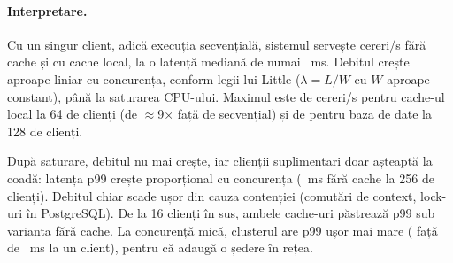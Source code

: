\paragraph{Interpretare.} Cu un singur client, adică execuția secvențială, sistemul servește
 cereri/s fără cache și  cu cache local, la o latență
mediană de numai ~ms. Debitul crește aproape liniar cu concurența, conform legii lui Little
($\lambda = L/W$ cu $W$ aproape constant), până la saturarea CPU-ului. Maximul este de
 cereri/s pentru cache-ul local la 64 de clienți (de $\approx$9× față de
secvențial) și de  pentru baza de date la 128 de clienți.

După saturare, debitul nu mai crește, iar clienții suplimentari doar așteaptă la coadă: latența p99 crește
proporțional cu concurența (~ms fără cache la 256 de clienți). Debitul chiar scade ușor
din cauza contenției (comutări de context, lock-uri în PostgreSQL). De la 16 clienți în sus, ambele cache-uri
păstrează p99 sub varianta fără cache. La concurență mică, clusterul are p99 ușor mai mare
( față de ~ms la un client), pentru că adaugă o ședere în rețea.
